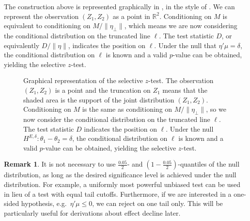 \documentclass[aoas, preprint]{imsart}
\theoremstyle{definition}
\newtheorem*{remark}{Remark}
\theoremstyle{custom}
\begin{document}
  The construction above is represented graphically in , in the style of \citet{Lee:2016fv}. We can represent the observation $(Z_1, Z_2)$ as a point in $\mathbb{R}^2$. Conditioning on $M$ is equivalent to conditioning on $M / \|\eta_\perp\|$, which means we are now considering the conditional distribution on the truncated line $\ell$. The test statistic $D$, or equivalently $D / \|\eta\|$, indicates the position on $\ell$. Under the null that $\eta' \mu  = \delta$, the conditional distribution on $\ell$ is known and a valid $p$-value can be obtained, yielding the selective $z$-test.
  \begin{figure}[htbp]
    \centering
    \caption{Graphical representation of the selective $z$-test. The observation $(Z_1, Z_2)$ is a point and the truncation on $Z_1$ means that the shaded area is the support of the joint distribution $(Z_1, Z_2)$. Conditioning on $M$ is the same as conditioning on $M / \|\eta_\perp\|$, so we now consider the conditional distribution on the truncated line $\ell$. The test statistic $D$ indicates the position on $\ell$. Under the null $H^{E,\delta}: \theta_1 - \theta_2 = \delta$, the conditional distribution on $\ell$ is known and a valid $p$-value can be obtained, yielding the selective $z$-test.}
  \label{fig:sel-gauss}
  \end{figure}

  \begin{remark}
    It is not necessary to use $\frac{0.05}{2}$- and $(1 - \frac{0.05}{2})$-quantiles of the null distribution, as long as the desired significance level is achieved under the null distribution. For example, a uniformly most powerful unbiased test can be used in lieu of a test with equal tail cutoffs. Furthermore, if we are interested in a one-sided hypothesis, e.g.\ $\eta' \mu \le 0$, we can reject on one tail only. This will be particularly useful for derivations about effect decline later.
  \end{remark}
\end{document}
